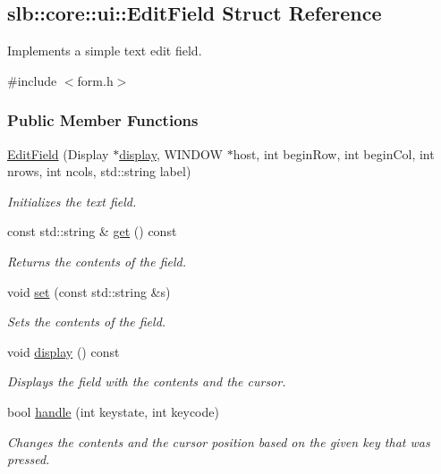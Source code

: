 \hypertarget{structslb_1_1core_1_1ui_1_1EditField}{}\subsection{slb\+:\+:core\+:\+:ui\+:\+:Edit\+Field Struct Reference}
\label{structslb_1_1core_1_1ui_1_1EditField}


Implements a simple text edit field.  




{\ttfamily \#include $<$form.\+h$>$}

\subsubsection*{Public Member Functions}
\begin{DoxyCompactItemize}
\item 
\hyperlink{structslb_1_1core_1_1ui_1_1EditField_a607291bf49b0dca5cbff3bac7767f869}{Edit\+Field} (Display $\ast$\hyperlink{structslb_1_1core_1_1ui_1_1EditField_ab8483df66ec0bca8e5d59ea547113a04}{display}, W\+I\+N\+D\+OW $\ast$host, int begin\+Row, int begin\+Col, int nrows, int ncols, std\+::string label)
\begin{DoxyCompactList}\small\item\em Initializes the text field. \end{DoxyCompactList}\item 
const std\+::string \& \hyperlink{structslb_1_1core_1_1ui_1_1EditField_adc15bb0294ab839703a01da5bd8c6106}{get} () const 
\begin{DoxyCompactList}\small\item\em Returns the contents of the field. \end{DoxyCompactList}\item 
void \hyperlink{structslb_1_1core_1_1ui_1_1EditField_ada16e8ea3582fd61e02291b52713e383}{set} (const std\+::string \&s)
\begin{DoxyCompactList}\small\item\em Sets the contents of the field. \end{DoxyCompactList}\item 
void \hyperlink{structslb_1_1core_1_1ui_1_1EditField_ab8483df66ec0bca8e5d59ea547113a04}{display} () const \hypertarget{structslb_1_1core_1_1ui_1_1EditField_ab8483df66ec0bca8e5d59ea547113a04}{}\label{structslb_1_1core_1_1ui_1_1EditField_ab8483df66ec0bca8e5d59ea547113a04}

\begin{DoxyCompactList}\small\item\em Displays the field with the contents and the cursor. \end{DoxyCompactList}\item 
bool \hyperlink{structslb_1_1core_1_1ui_1_1EditField_af2c80046ff30430c2befb2dda3603abe}{handle} (int keystate, int keycode)
\begin{DoxyCompactList}\small\item\em Changes the contents and the cursor position based on the given key that was pressed. \end{DoxyCompactList}\end{DoxyCompactItemize}
